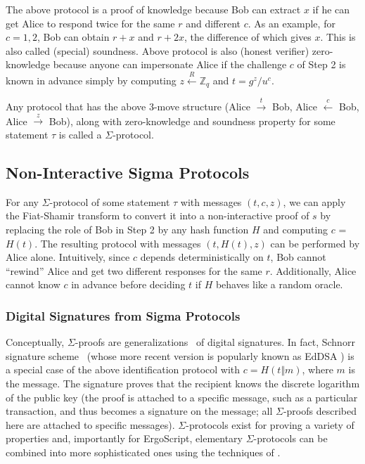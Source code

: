 \documentclass[11pt]{article}
\newcommand{\langname}{ErgoScript\xspace}
\begin{document}
The above protocol is a proof of knowledge because Bob can extract $x$ if he can get Alice to respond twice for the same $r$ and different $c$. As an example, for $c = 1, 2$, Bob can obtain $r+x$ and $r+2x$, the difference of which gives $x$. This is also called (special) soundness. Above protocol is also (honest verifier) zero-knowledge because anyone can impersonate Alice if the challenge $c$ of Step 2 is known in advance simply by computing $z \stackrel{R}{\leftarrow} \mathbb{Z}_q$ and $t = g^z/u^c$. 

Any protocol that has the above 3-move structure (Alice $\stackrel{t}{\rightarrow}$ Bob, Alice $\stackrel{c}{\leftarrow}$ Bob, Alice $\stackrel{z}{\rightarrow}$ Bob), along with zero-knowledge and soundness property for some statement $\tau$ is called a $\Sigma$-protocol. 

\subsection{Non-Interactive Sigma Protocols}
For any $\Sigma$-protocol of some statement $\tau$ with messages $(t, c, z)$, we can apply the Fiat-Shamir transform to convert it into a non-interactive proof of $s$ by replacing the role of Bob in Step 2 by any hash function $H$ and computing $c$ = $H(t)$. The resulting protocol with messages $(t, H(t), z)$ can be performed by Alice alone. Intuitively, since $c$ depends deterministically on $t$, Bob cannot ``rewind'' Alice and get two different responses for the same $r$. Additionally, Alice cannot know $c$ in advance before deciding $t$ if $H$ behaves like a random oracle. 

\subsubsection{Digital Signatures from Sigma Protocols}
\label{digital-sig}
Conceptually, $\Sigma$-proofs \cite{Cra96} are generalizations~\cite{CL06} of digital signatures.
In fact, Schnorr signature scheme~\cite{Sch91} (whose more recent version is popularly known as EdDSA \cite{BDLSY12,rfc8032}) is a special case of the above identification protocol with $c = H(t \Vert m)$, where $m$ is the message. The signature proves that the recipient knows the discrete logarithm of the public key (the proof is attached to a specific message, such as a particular transaction, and thus becomes a signature on the message; all $\Sigma$-proofs described here are attached to specific messages). $\Sigma$-protocols exist for proving a variety of properties and, importantly for \langname, elementary $\Sigma$-protocols can be combined into more sophisticated ones using the techniques of \cite{CDS94}. 
\end{document}
